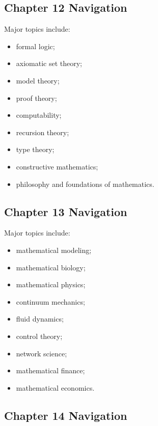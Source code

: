 \subsection{Chapter 12 Navigation}
\label{subsec:index-chapter-twelve}

Major topics include:

\begin{itemize}
    \item formal logic;
    \item axiomatic set theory;
    \item model theory;
    \item proof theory;
    \item computability;
    \item recursion theory;
    \item type theory;
    \item constructive mathematics;
    \item philosophy and foundations of mathematics.
\end{itemize}

\subsection{Chapter 13 Navigation}
\label{subsec:index-chapter-thirteen}

Major topics include:

\begin{itemize}
    \item mathematical modeling;
    \item mathematical biology;
    \item mathematical physics;
    \item continuum mechanics;
    \item fluid dynamics;
    \item control theory;
    \item network science;
    \item mathematical finance;
    \item mathematical economics.
\end{itemize}

\subsection{Chapter 14 Navigation}
\label{subsec:index-chapter-fourteen}

